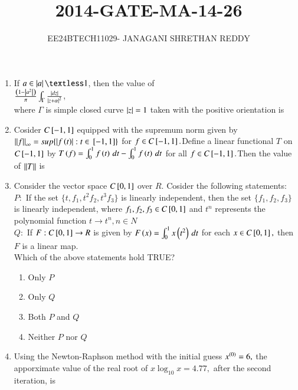 \documentclass[journal]{IEEEtran}
\begin{document}
 


\vspace{3cm}

\title{2014-GATE-MA-14-26}
\author{EE24BTECH11029- JANAGANI SHRETHAN REDDY}
\maketitle{}
\bigskip
\renewcommand{\thefigure}{\theenumi}
\renewcommand{\thetable}{\theenum}
\begin{enumerate}
    \item If $a\in \abs{a} \textless 1$, then the value of\\
    $\frac{\left(1-\left\vert a^2\right\vert\right)}{\pi}\int_{\Gamma}\frac{\left\vert dz\right\vert}{{\left\vert z+\alpha\right\vert}^2}$,\\
    where $\Gamma$ is simple closed curve $\left\vert z\right\vert=1$ taken with the positive orientation is\\
    \item Cosider $C{}\left[-1,1\right]$ equipped with the supremum norm given by $\left\vert\left\vert f\right\vert\right\vert_{\infty}=sup\{\left\vert f\left(t\right)\right\vert:t\in {}\left[-1,1\right]\}$ for 
    $f\in C{}\left[-1,1\right].$Define a linear functional $T$ on $C{}\left[-1,1\right]$ by $T\left(f\right)=\int_{0}^{1}f\left(t\right)\,dt-\int_{0}^{1}f\left(t\right)\,dt$ for all $f\in C{}\left[-1,1\right].$Then the value of $\left\vert\left\vert T\right\vert\right\vert$ is\\
    \item Consider the vector space $C{}\left[0,1\right]$ over $R$. Cosider the following statements:\\
    $P:$ If the set $\{t,f_1,t^2f_2,t^3f_3\}$ is linearly independent, then the set $\{f_1,f_2,f_3\}$ is linearly independent, where $f_1,f_2,f_3\in C{}\left[0,1\right]$ and $t^n$ represents the polynomial function $t\rightarrow t^n,n\in N$\\
    $Q:$ If $F:C{}\left[0,1\right]\rightarrow R$ is given by $F\left(x\right)=\int_{0}^{1}x\left(t^2\right)\,dt$ for each $x\in C{}\left[0,1\right],$ then $F$ is a linear map.\\
    Which of the above statements hold TRUE?
    \begin{enumerate}
        \item Only $P$
        \item Only $Q$
        \item Both $P$ and $Q$
        \item Neither $P$ nor $Q$\\
    \end{enumerate}
    \item Using the Newton-Raphson method with the initial guess $x^{\left(0\right)}=6,$ the apporximate value of the real root of $x\log_{10}x=4.77,$ after the second iteration, is\\

\end{enumerate}
\end{document}
